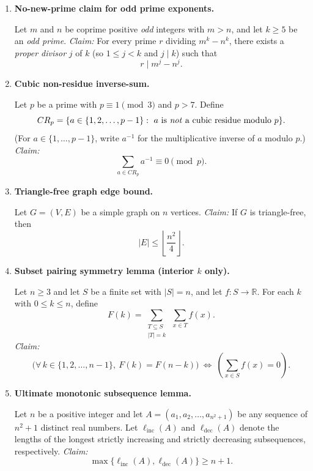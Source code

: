 \begin{enumerate}[label=\textbf{\Alph*.},leftmargin=*]

\item \textbf{No-new-prime claim for odd prime exponents.}

Let $m$ and $n$ be coprime positive \emph{odd} integers with $m>n$, and let $k\ge 5$ be an \emph{odd prime}.
\emph{Claim:} For every prime $r$ dividing $m^k-n^k$, there exists a \emph{proper divisor} $j$ of $k$ (so $1\le j<k$ and $j\mid k$) such that
\[
r\mid m^j-n^j.
\]

\item \textbf{Cubic non-residue inverse-sum.}

Let $p$ be a prime with $p\equiv 1\pmod 3$ and $p>7$. Define
\[
CR_p=\{a\in\{1,2,\dots,p-1\}:\ a\text{ is \emph{not} a cubic residue modulo }p\}.
\]
(For $a\in\{1,\dots,p-1\}$, write $a^{-1}$ for the multiplicative inverse of $a$ modulo $p$.)
\emph{Claim:}
\[
\sum_{a\in CR_p} a^{-1} \equiv 0 \pmod p.
\]

\item \textbf{Triangle-free graph edge bound.}

Let $G=(V,E)$ be a simple graph on $n$ vertices.
\emph{Claim:} If $G$ is triangle-free, then
\[
|E|\le \left\lfloor \frac{n^2}{4}\right\rfloor.
\]

\item \textbf{Subset pairing symmetry lemma (interior $k$ only).}

Let $n\ge 3$ and let $S$ be a finite set with $|S|=n$, and let $f:S\to\mathbb{R}$.
For each $k$ with $0\le k\le n$, define
\[
F(k)=\sum_{\substack{T\subseteq S\\ |T|=k}}\ \sum_{x\in T} f(x).
\]
\emph{Claim:}
\[
\bigl(\forall\,k\in\{1,2,\dots,n-1\},\ F(k)=F(n-k)\bigr)\ \Longleftrightarrow\ \left(\sum_{x\in S} f(x)=0\right).
\]

\item \textbf{Ultimate monotonic subsequence lemma.}

Let $n$ be a positive integer and let $A=(a_1,a_2,\dots,a_{n^2+1})$ be any sequence of $n^2+1$ distinct real numbers.
Let $\ell_{\mathrm{inc}}(A)$ and $\ell_{\mathrm{dec}}(A)$ denote the lengths of the longest strictly increasing and strictly decreasing subsequences, respectively.
\emph{Claim:}
\[
\max\{\ell_{\mathrm{inc}}(A),\ell_{\mathrm{dec}}(A)\}\ge n+1.
\]

\end{enumerate}



